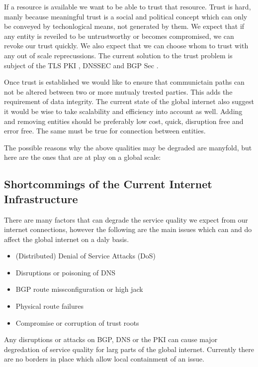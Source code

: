 \documentclass[../eva1_scion.tex]{subfiles}
\begin{document}
If a resource is available we want to be able to trust that resource. Trust is hard, manly because meaningful trust is a social and political concept which can only be conveyed by techonlogical means, not generated by them. We expect that if any entity is reveiled to be untrustworthy or becomes compromised, we can revoke our trust quickly. We also expect that we can choose whom to trust with any out of scale reprecussions. The current solution to the trust problem is subject of the TLS PKI \cite{tls_pki}, DNSSEC \cite{dnssec} and BGP Sec \cite{bgpsec}.

Once trust is established we would like to ensure that communictain paths can not be altered between two or more mutualy trested parties. This adds the requirement of data integrity. The current state of the global internet also suggest it would be wise to take scalability and efficiency into account as well. Adding and removing entities should be preferably low cost, quick, disruption free and error free. The same must be true for connection between entities.

The possible reasons why the above qualities may be degraded are manyfold, but here are the ones that are at play on a global scale:

\subsection{Shortcommings of the Current Internet Infrastructure}%
\label{ssec:shortcommings}

There are many factors that can degrade the service quality we expect from our internet connections, however the following are the main issues which can and do affect the global internet on a daly basis.

\begin{itemize}
    \item (Distributed) Denial of Service Attacks (DoS)
    \item Disruptions or poisoning of DNS
    \item BGP route missconfiguration or high jack
    \item Physical route failures
    \item Compromise or corruption of trust roots
\end{itemize}

Any disruptions or attacks on BGP, DNS or the PKI can cause major degredation of service quality for larg parts of the global internet. Currently there are no borders in place which allow local containment of an issue.
\end{document}
